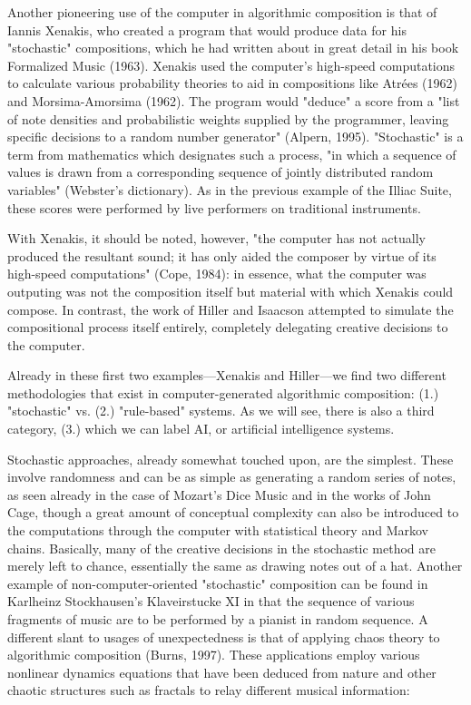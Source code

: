 \documentclass{automatextcc}
\begin{document}
Another pioneering use of the computer in algorithmic composition is that of Iannis Xenakis, who created a program that would produce data for his "stochastic" compositions, which he had written about in great detail in his book Formalized Music (1963). Xenakis used the computer's high-speed computations to calculate various probability theories to aid in compositions like Atrées (1962) and Morsima-Amorsima (1962). The program would "deduce" a score from a "list of note densities and probabilistic weights supplied by the programmer, leaving specific decisions to a random number generator" (Alpern, 1995). "Stochastic" is a term from mathematics which designates such a process, "in which a sequence of values is drawn from a corresponding sequence of jointly distributed random variables" (Webster's dictionary). As in the previous example of the Illiac Suite, these scores were performed by live performers on traditional instruments.

With Xenakis, it should be noted, however, "the computer has not actually produced the resultant sound; it has only aided the composer by virtue of its high-speed computations" (Cope, 1984): in essence, what the computer was outputing was not the composition itself but material with which Xenakis could compose. In contrast, the work of Hiller and Isaacson attempted to simulate the compositional process itself entirely, completely delegating creative decisions to the computer.

Already in these first two examples—Xenakis and Hiller—we find two different methodologies that exist in computer-generated algorithmic composition: (1.) "stochastic" vs. (2.) "rule-based" systems. As we will see, there is also a third category, (3.) which we can label AI, or artificial intelligence systems.

Stochastic approaches, already somewhat touched upon, are the simplest. These involve randomness and can be as simple as generating a random series of notes, as seen already in the case of Mozart's Dice Music and in the works of John Cage, though a great amount of conceptual complexity can also be introduced to the computations through the computer with statistical theory and Markov chains. Basically, many of the creative decisions in the stochastic method are merely left to chance, essentially the same as drawing notes out of a hat. Another example of non-computer-oriented "stochastic" composition can be found in Karlheinz Stockhausen's Klaveirstucke XI in that the sequence of various fragments of music are to be performed by a pianist in random sequence. A different slant to usages of unexpectedness is that of applying chaos theory to algorithmic composition (Burns, 1997). These applications employ various nonlinear dynamics equations that have been deduced from nature and other chaotic structures such as fractals to relay different musical information:
\end{document}
